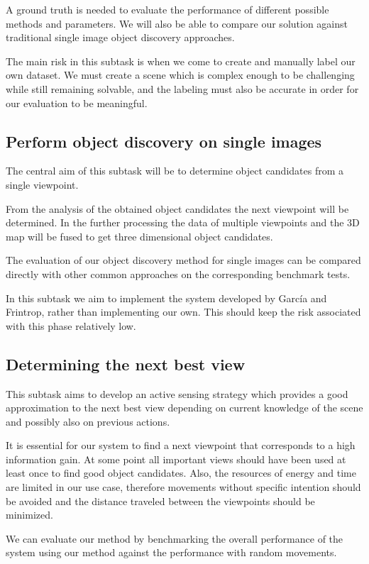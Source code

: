 \documentclass[a4paper,11pt,english]{article}
\begin{document}
A ground truth is needed to evaluate the performance of different possible methods and parameters.
We will also be able to compare our solution against traditional single image object discovery approaches.

The main risk in this subtask is when we come to create and manually label our own dataset.
We must create a scene which is complex enough to be challenging while still remaining solvable, and the labeling must also be accurate in order for our evaluation to be meaningful.

\subsection{Perform object discovery on single images}\label{subtask-objectdiscovery}
The central aim of this subtask will be to determine object candidates from a single viewpoint.

From the analysis of the obtained object candidates the next viewpoint will be determined.
In the further processing the data of multiple viewpoints and the 3D map will be fused to get three dimensional object candidates.

The evaluation of our object discovery method for single images can be compared directly with other common approaches on the corresponding benchmark tests.

In this subtask we aim to implement the system developed by Garc\'{i}a and Frintrop, rather than implementing our own. This should keep the risk associated with this phase relatively low.

\subsection{Determining the next best view}\label{subtask-nbv}
This subtask aims to develop an active sensing strategy which provides a good approximation to the next best view depending on current knowledge of the scene and possibly also on previous actions.

It is essential for our system to find a next viewpoint that corresponds to a high information gain.
At some point all important views should have been used at least once to find good object candidates.
Also, the resources of energy and time are limited in our use case, therefore movements without specific intention should be avoided and the distance traveled between the viewpoints should be minimized.

We can evaluate our method by benchmarking the overall performance of the system using our method against the performance with random movements.
\end{document}
